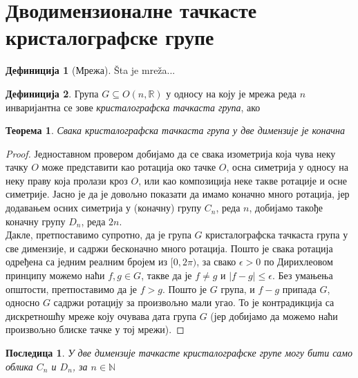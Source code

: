 \documentclass{report}
\theoremstyle{plain}
\newtheorem{thm}{Теорема}
\newtheorem{cor}{Последица}
\theoremstyle{definition}
\newtheorem{defn}{Дефиниција}
\begin{document}
\section{Дводимензионалне тачкасте кристалографске групе}
\begin{defn}[Мрежа]
\v Sta je mre\v za...
\end{defn}
\begin{defn}
Група $G\subseteq O(n, \mathbb{R})$ у односу на коју је мрежа реда $n$ инваријантна се зове \emph{кристалографска тачкаста група}, ако
\end{defn}

\begin{thm}
Свака кристалографска тачкаста група у две димензије је коначна
\end{thm}
\begin{proof}
Једноставном провером добијамо да се свака изометрија која чува неку тачку $O$ може представити као ротација око тачке $O$, осна симетрија у односу на неку праву која пролази кроз $O$, или као композиција неке такве ротације и осне симетрије. Јасно је да је довољно показати да имамо коначно много ротација, јер додавањем осних симетрија у (коначну) групу $C_n$, реда $n$, добијамо такође коначну групу $D_n$, реда $2n$.\\
Дакле, претпоставимо супротно, да је група $G$ кристалографска тачкаста група у све димензије, и садржи бесконачно много ротација. Пошто је свака ротација одређена са једним реалним бројем из $[0,2\pi)$, за свако $\epsilon>0$ по Дирихлеовом принципу можемо наћи $f, g\in G$, такве да је $f\neq g$ и $|f-g|\leq\epsilon$. Без умањења општости, претпоставимо да је $f>g$. Пошто је $G$ група, и $f-g$ припада $G$, односно $G$ садржи ротацију за произвољно мали угао. То је контрадикција са дискретношћу мреже коју очувава дата група $G$ (јер добијамо да можемо наћи произвољно блиске тачке у тој мрежи).
\end{proof}
\begin{cor}
У две димензије тачкасте кристалографске групе могу бити само облика $C_n$ и $D_n$, за $n\in\mathbb{N}$
\end{cor}
\end{document}
